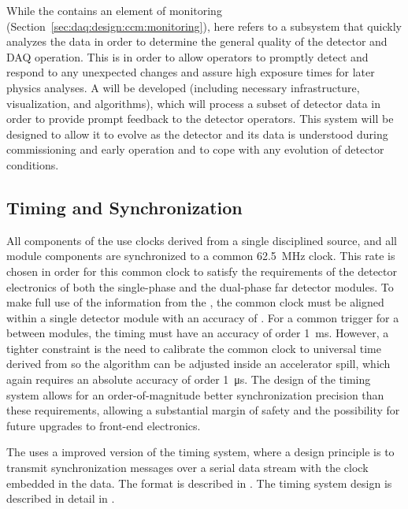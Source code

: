 While the  contains an element of monitoring (Section~\ref{sec:daq:design:ccm:monitoring}), here  refers to a subsystem that quickly analyzes the data in order to determine the general quality of the detector and DAQ operation.
This is in order to allow operators to promptly detect and respond to any unexpected changes and assure high exposure times for later physics analyses. 
A   
will be developed (including necessary infrastructure, visualization,
and algorithms), which will process a subset of detector data in order
to provide prompt feedback to the detector operators. 
This system will be designed to allow it to evolve as the detector and its data is understood during commissioning and early operation and to cope with any evolution of detector conditions.


\subsection{Timing and Synchronization}
\label{sec:sp-daq:design-timing}

All components of the  use clocks derived from a single
 disciplined source, and all module components are
synchronized to a common \SI{62.5}{MHz} clock.
%
This rate is chosen in order for this common clock to satisfy the requirements of the detector electronics of both the single-phase and the dual-phase far detector modules.
%
To make full use of the information from the , the common clock must be aligned within a single detector %
module with an accuracy of . 
For a common trigger for a  between modules, the timing must have an accuracy of order \SI{1}{\milli\second}.
However, a tighter constraint is the need to calibrate the common clock to universal time derived from  so the  algorithm can be adjusted inside an accelerator spill, which again requires an absolute accuracy of order \SI{1}{\micro\second}. The design of the timing system allows for an order-of-magnitude better synchronization precision than these requirements, allowing a substantial margin of safety and the possibility for future upgrades to front-end electronics.

The   uses a improved version of the  timing
system, where a design principle is to transmit synchronization messages over
a serial data stream with the clock embedded in the data. The format
is described in . The timing system design is
described in detail in .

